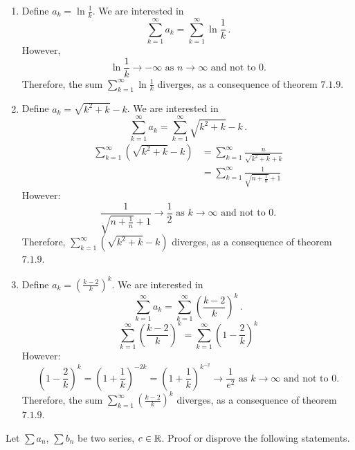 \documentclass[week=5]{homework}
\begin{document}
\begin{questions}
\begin{enumerate}[label=(\alph*)]
	    	\item Define $a_k = \ln \frac{1}{k}$. We are interested in 
	    	\[
	    	\sum_{k=1}^{\infty} a_k = \sum_{k=1}^{\infty} \ln \frac{1}{k}\,.
	    	\] 
	    	However, 
	    	\[
	    	\ln \frac{1}{k} \to - \infty \text{ as } n \to \infty \text{ and not to } 0.
	    	\]
	    	Therefore, the sum $\sum_{k = 1}^{\infty} \ln \frac{1}{k}$ diverges, as a consequence of theorem $7.1.9$.
	    	
	    	\addtocounter{enumi}{1}
	    	\item Define $a_k = \sqrt{k^2 + k} -k$. We are interested in 
	    	\[
	    	\sum_{k=1}^{\infty} a_k = \sum_{k=1}^{\infty} \sqrt{k^2 + k} -k\,.
	    	\]
	    	\begin{align*}
	    	\sum_{k = 1}^{\infty} \left(\sqrt{k^2 + k} - k \right) &= \sum_{k = 1}^{\infty} \frac{n}{\sqrt{k^2 + k} + k } \\
	    	&= \sum_{k = 1}^{\infty} \frac{1}{\sqrt{n + \frac{1}{n}} + 1}
	    	\end{align*}
	    	However:
	    	\[
	    	\frac{1}{\sqrt{n + \frac{1}{n}} + 1} \to \frac{1}{2} \text{ as } k \to \infty \text{ and not to } 0. 
	    	\]
	    	Therefore, $\sum_{k = 1}^{\infty} \left(\sqrt{k^2 + k} - k \right)$ diverges, as a consequence of theorem $7.1.9$.	       	
	    	
	    	\addtocounter{enumi}{1}
	    	\item Define $a_k = \left(\frac{k-2}{k}\right)^k$. We are interested in 
	    	\[
	    	\sum_{k=1}^{\infty} a_k = \sum_{k=1}^{\infty} \left(\frac{k-2}{k}\right)^k\,.
	    	\]
	    	\[
	    	\sum_{k = 1}^{\infty} \left(\frac{k - 2}{k} \right)^k = \sum_{k = 1}^{\infty} \left(1 - \frac{2}{k} \right)^k
	    	\]
	    	However:
	    	\[
	    	\left(1 - \frac{2}{k} \right)^k = \left(1 + \frac{1}{k} \right)^{-2k} = \left(1 + \frac{1}{k} \right)^{k^{-2}} \to \frac{1}{e^2} \text{ as } k \to \infty \text{ and not to } 0.
	    	\]
	    	Therefore, the sum $\sum_{k = 1}^{\infty} \left(\frac{k - 2}{k} \right)^k$ diverges, as a consequence of theorem $7.1.9$.
	    	
	    \end{enumerate}
    
	    \question
	    Let $\sum a_n$, $\sum b_n$ be two series, $c\in\mathbb{R}$. Proof or disprove the following statements.
	    
\end{questions}
\end{document}
